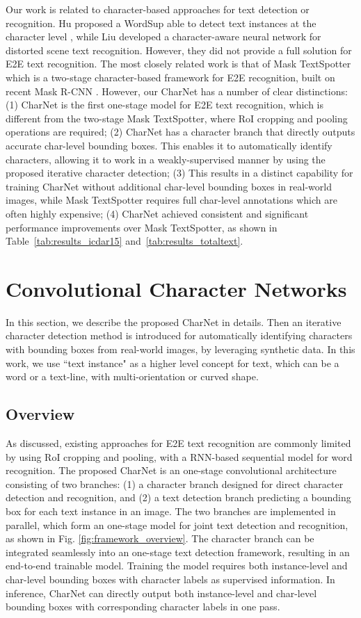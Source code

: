 \documentclass[10pt,twocolumn,letterpaper]{article}
\begin{document}
Our work is related to character-based approaches for text detection or recognition. Hu \etal proposed a WordSup able to detect text instances at the character level \cite{hu2017wordsup}, while Liu \etal \cite{liu2018char} developed a character-aware neural network for distorted scene text recognition. However, they did not provide a full solution for E2E text recognition. The most closely related work is that of  Mask TextSpotter \cite{lyu2018mask} which is a two-stage character-based framework for E2E recognition, built on recent Mask R-CNN \cite{he2017single}. However, our CharNet has a number of clear distinctions: (1) CharNet is the first one-stage model for E2E text recognition, which is different from the two-stage Mask TextSpotter, where RoI cropping and pooling operations are required; (2) CharNet has a character branch that directly outputs accurate char-level bounding boxes. This enables it to automatically identify characters, allowing it to work in a weakly-supervised manner by using the proposed iterative character detection;
(3) This results in a distinct capability for training CharNet without additional char-level bounding boxes in real-world images, while Mask TextSpotter requires full char-level annotations which are often highly expensive; (4) CharNet achieved consistent and significant performance improvements over Mask TextSpotter, as shown in Table~\ref{tab:results_icdar15} and~\ref{tab:results_totaltext}.


\section{Convolutional Character Networks}
In this section, we describe the proposed CharNet in details.
Then an iterative character detection method is introduced for automatically identifying characters with bounding boxes from real-world images, by leveraging synthetic data. In this work, we use ``text instance" as a higher level concept for text, which can be a word or a text-line, with multi-orientation or curved shape.




\subsection{Overview}
As discussed, existing approaches for E2E text recognition are commonly limited by using RoI cropping and pooling, with a RNN-based sequential model for word recognition. The proposed CharNet is an one-stage convolutional architecture consisting of two branches: (1) a character branch designed for direct character detection and recognition, and (2) a text detection branch predicting a bounding box for each text instance in an image.
The two branches are implemented in parallel, which form an one-stage model for joint text detection and recognition, as shown in Fig. \ref{fig:framework_overview}.
The character branch can be integrated seamlessly into an one-stage text detection framework, resulting in an end-to-end trainable model. Training the model requires both instance-level and char-level bounding boxes with character labels as supervised information. In inference, CharNet can directly output both instance-level and char-level bounding boxes with corresponding character labels in one pass.
\end{document}
